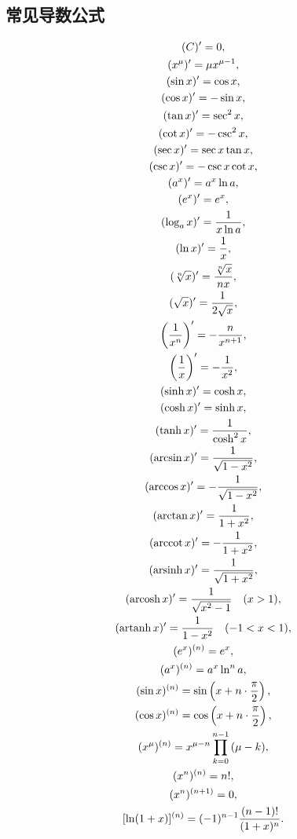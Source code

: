 \subsection{常见导数公式}
\begin{gather*}
(C)' = 0, \\
(x^\mu)' = \mu x^{\mu-1}, \\
(\sin x)' = \cos x, \\
(\cos x)' = - \sin x, \\
(\tan x)' = \sec^2 x, \\
(\cot x)' = - \csc^2 x, \\
(\sec x)' = \sec x \tan x, \\
(\csc x)' = - \csc x \cot x, \\
(a^x)' = a^x \ln a, \\
(e^x)' = e^x, \\
(\log_a x)' = \frac{1}{x \ln a}, \\
(\ln x)' = \frac{1}{x}, \\
(\sqrt[n]{x})' = \frac{\sqrt[n]{x}}{n x}, \\
(\sqrt{x})' = \frac{1}{2\sqrt{x}}, \\
\left(\frac{1}{x^n}\right)' = -\frac{n}{x^{n+1}}, \\
\left(\frac{1}{x}\right)' = -\frac{1}{x^2}, \\
(\sinh x)' = \cosh x, \\
(\cosh x)' = \sinh x, \\
(\tanh x)' = \frac{1}{\cosh^2 x}, \\
(\arcsin x)' = \frac{1}{\sqrt{1 - x^2}}, \\
(\arccos x)' = - \frac{1}{\sqrt{1 - x^2}}, \\
(\arctan x)' = \frac{1}{1 + x^2}, \\
(\arccot x)' = - \frac{1}{1 + x^2}, \\
(\arsinh x)' = \frac{1}{\sqrt{1 + x^2}}, \\
(\arcosh x)' = \frac{1}{\sqrt{x^2 - 1}} \quad (x > 1), \\
(\artanh x)' = \frac{1}{1 - x^2} \quad (-1 < x < 1), \\
(e^x)^{(n)} = e^x, \\
(a^x)^{(n)} = a^x \ln^n a, \\
(\sin x)^{(n)} = \sin \left( x + n \cdot \frac{\pi}{2} \right), \\
(\cos x)^{(n)} = \cos \left( x + n \cdot \frac{\pi}{2} \right), \\
(x^\mu)^{(n)} = x^{\mu-n}\prod_{k=0}^{n-1} {(\mu - k)}, \\
(x^n)^{(n)} = n!, \\
(x^n)^{(n+1)} = 0, \\
[\ln(1+x)]^{(n)} = (-1)^{n-1} \frac{(n-1)!}{(1+x)^n}.
\end{gather*}
